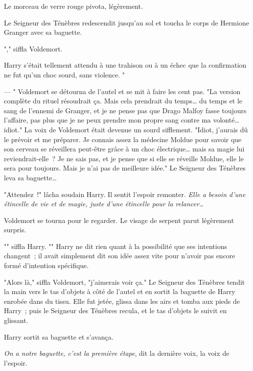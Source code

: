 Le morceau de verre rouge pivota, légèrement.

Le Seigneur des Ténèbres redescendit jusqu'au sol et toucha le corps de Hermione Granger avec sa baguette.

"," siffla Voldemort.

Harry s'était tellement attendu à une trahison ou à un échec que la confirmation ne fut qu'un choc sourd, sans violence. "

--- " Voldemort se détourna de l'autel et se mit à faire les cent pas. "La version complète du rituel résoudrait ça. Mais cela prendrait du temps… du temps et le sang de l'ennemi de Granger, et je ne pense pas que Drago Malfoy fasse toujours l'affaire, pas plus que je ne peux prendre mon propre sang contre ma volonté… idiot." La voix de Voldemort était devenue un sourd sifflement. "Idiot, j'aurais dû le prévoir et me préparer. Je connais assez la médecine Moldue pour savoir que son cerveau se réveillera peut-être grâce à un choc électrique… mais sa magie lui reviendrait-elle~? Je ne sais pas, et je pense que si elle se réveille Moldue, elle le sera pour toujours. Mais je n'ai pas de meilleure idée." Le Seigneur des Ténèbres leva sa baguette…

"Attendez~!" lâcha soudain Harry. Il sentit l'espoir remonter. \emph{Elle a besoin d'une étincelle de vie et de magie, juste d'une étincelle pour la relancer…}

Voldemort se tourna pour le regarder. Le visage de serpent parut légèrement surpris.

"" siffla Harry. "" Harry ne dit rien quant à la possibilité que ses intentions changent~; il avait simplement dit son idée assez vite pour n'avoir pas encore formé d'intention spécifique.

"Alors là," siffla Voldemort, "j'aimerais voir ça." Le Seigneur des Ténèbres tendit la main vers le tas d'objets à côté de l'autel et en sortit la baguette de Harry enrobée dans du tissu. Elle fut jetée, glissa dans les airs et tomba aux pieds de Harry~; puis le Seigneur des Ténèbres recula, et le tas d'objets le suivit en glissant.

Harry sortit sa baguette et s'avança.

\emph{On a notre baguette, c'est la première étape}, dit la dernière voix, la voix de l'espoir.

